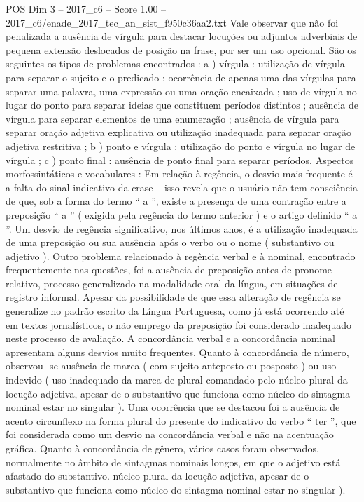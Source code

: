 \begin{textsample}{POS Dim 3 – 2017\_c6 – Score 1.00 – 2017\_c6/enade\_2017\_tec\_an\_sist\_f950c36aa2.txt}
Vale observar que não foi penalizada a ausência de vírgula para destacar locuções ou adjuntos adverbiais de pequena extensão deslocados de posição na frase, por ser um uso opcional.
São os seguintes os tipos de problemas encontrados : a ) vírgula : utilização de vírgula para separar o sujeito e o predicado ; ocorrência de apenas uma das vírgulas para separar uma palavra, uma expressão ou uma oração encaixada ; uso de vírgula no lugar do ponto para separar ideias que constituem períodos distintos ; ausência de vírgula para separar elementos de uma enumeração ; ausência de vírgula para separar oração adjetiva explicativa ou utilização inadequada para separar oração adjetiva restritiva ; b ) ponto e vírgula : utilização do ponto e vírgula no lugar de vírgula ; c ) ponto final : ausência de ponto final para separar períodos.
Aspectos morfossintáticos e vocabulares : Em relação à regência, o desvio mais frequente é a falta do sinal indicativo da crase – isso revela que o usuário não tem consciência de que, sob a forma do termo “ a ”, existe a presença de uma contração entre a preposição “ a ” ( exigida pela regência do termo anterior ) e o artigo definido “ a ”.
Um desvio de regência significativo, nos últimos anos, é a utilização inadequada de uma preposição ou sua ausência após o verbo ou o nome ( substantivo ou adjetivo ).
Outro problema relacionado à regência verbal e à nominal, encontrado frequentemente nas questões, foi a ausência de preposição antes de pronome relativo, processo generalizado na modalidade oral da língua, em situações de registro informal.
Apesar da possibilidade de que essa alteração de regência se generalize no padrão escrito da Língua Portuguesa, como já está ocorrendo até em textos jornalísticos, o não emprego da preposição foi considerado inadequado neste processo de avaliação.
A concordância verbal e a concordância nominal apresentam alguns desvios muito frequentes.
Quanto à concordância de número, observou -se ausência de marca ( com sujeito anteposto ou posposto ) ou uso indevido ( uso inadequado da marca de plural comandado pelo núcleo plural da locução adjetiva, apesar de o substantivo que funciona como núcleo do sintagma nominal estar no singular ).
Uma ocorrência que se destacou foi a ausência de acento circunflexo na forma plural do presente do indicativo do verbo “ ter ”, que foi considerada como um desvio na concordância verbal e não na acentuação gráfica.
Quanto à concordância de gênero, vários casos foram observados, normalmente no âmbito de sintagmas nominais longos, em que o adjetivo está afastado do substantivo. núcleo plural da locução adjetiva, apesar de o substantivo que funciona como núcleo do sintagma nominal estar no singular ).

\end{textsample}
